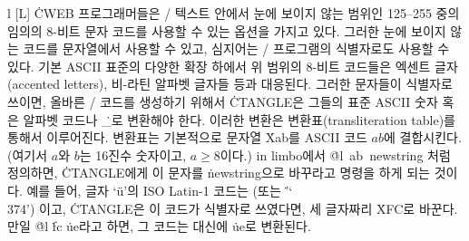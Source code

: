 \@{l} [L] \.{CWEB} 프로그래머들은 \TEX/ 텍스트 안에서 눈에 보이지 않는
범위인 125--255 중의 임의의 8-비트 문자 코드를 사용할 수 있는 옵션을
가지고 있다. 그러한 눈에 보이지 않는 코드를 문자열에서 사용할 수 있고,
심지어는 \CEE/ 프로그램의 식별자로도 사용할 수 있다. 기본 ASCII 표준의
다양한 확장 하에서 위 범위의 8-비트 코드들은 엑센트 글자(accented
letters), 비-라틴 알파벳 글자들 등과 대응된다. 그러한 문자들이
식별자로 쓰이면, 올바른 \CEE/ 코드를 생성하기 위해서 \.{CTANGLE}은
그들의 표준 ASCII 숫자 혹은 알파벳 코드나 \.{\_}로 변환해야 한다. 이러한
변환은 변환표(transliteration table)를 통해서 이루어진다. 변환표는
기본적으로 문자열 \.{Xab}를 ASCII 코드 \T{\^}$ab$에
결합시킨다. (여기서 $a$와 $b$는 16진수 숫자이고, $a\ge8$이다.) 
in limbo에서 \.{@l\ ab\ newstring} 처럼 정의하면, \.{CTANGLE}에게 이
문자를 \.{newstring}으로 바꾸라고 명령을 하게 되는 것이다. 예를 들어, 
글자 `\"u'의 ISO Latin-1 코드는  (또는 \.{'\char`\\374'})
이고, \.{CTANGLE}은 이 코드가 식별자로 쓰였다면, 세 글자짜리 \.{XFC}로
바꾼다. 만일 \.{@l} \.{fc} \.{ue}라고 하면, 그 코드는 대신에 \.{ue}로
변환된다. 

